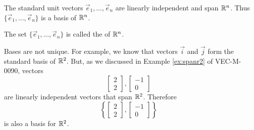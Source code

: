 \documentclass{ximera}
\begin{document}
\begin{example}
The standard unit vectors $\vec{e}_1, \ldots ,\vec{e}_n$ are linearly independent and span $\mathbb{R}^n$.  Thus $\{\vec{e}_1, \ldots ,\vec{e}_n\}$ is a basis of $\mathbb{R}^n$.
\end{example}

\begin{definition} The set $\{\vec{e}_1, \ldots ,\vec{e}_n\}$ is called the  of $\mathbb{R}^n$.
\end{definition}

Bases are not unique.  For example, we know that vectors $\vec{i}$ and $\vec{j}$ form the standard basis of $\mathbb{R}^2$.  But, as we discussed in Example \ref{ex:spanr2} of VEC-M-0090, vectors 
$$\begin{bmatrix}2\\2\end{bmatrix}, \begin{bmatrix}-1\\0\end{bmatrix}$$
are linearly independent vectors that span $\mathbb{R}^2$.  Therefore $$\left\{\begin{bmatrix}2\\2\end{bmatrix}, \begin{bmatrix}-1\\0\end{bmatrix}\right\}$$
is also a basis for $\mathbb{R}^2$.
\end{document}

